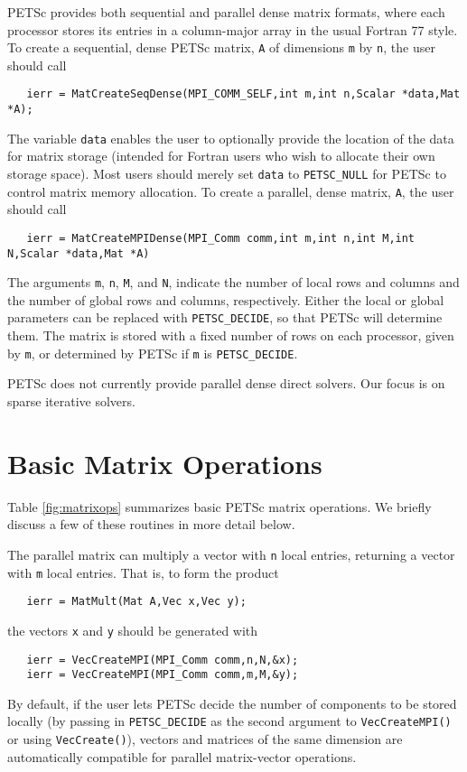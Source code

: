 PETSc provides both sequential and parallel dense matrix formats,
where each processor stores its entries in a column-major array in the
usual Fortran 77 style.  To create a sequential, dense PETSc matrix,
{\tt A} of dimensions {\tt m} by {\tt n}, the user should
call 
\begin{verbatim}
   ierr = MatCreateSeqDense(MPI_COMM_SELF,int m,int n,Scalar *data,Mat *A);
\end{verbatim}
The variable {\tt data} enables the user to optionally provide the
location of the data for matrix storage (intended for Fortran users who
wish to allocate their own storage space).  Most users should merely
set {\tt data} to {\tt PETSC\_NULL} for PETSc to control matrix memory allocation.
To create a parallel, dense matrix, {\tt A}, the user should call
\begin{verbatim}
   ierr = MatCreateMPIDense(MPI_Comm comm,int m,int n,int M,int N,Scalar *data,Mat *A)
\end{verbatim}
The arguments {\tt m}, {\tt n}, 
{\tt M}, and {\tt N}, indicate the number of local rows and columns and
the number of global rows and columns, respectively. Either the local or
global parameters can be replaced with {\tt PETSC\_DECIDE}, so that 
PETSc will determine  them.
The matrix is stored with a fixed number of rows on 
each processor, given by {\tt m}, or determined by PETSc if {\tt m} is
{\tt PETSC\_DECIDE}. 

PETSc does not currently provide parallel dense direct solvers. Our focus is on 
sparse iterative solvers.

\section{Basic Matrix Operations}
\label{sec:matoptions}

Table \ref{fig:matrixops} summarizes basic PETSc matrix operations.
We briefly discuss a few of these routines in more detail below.

The parallel matrix can multiply a vector with {\tt n} 
local entries, returning a vector with {\tt m} local entries. That is, 
to form the product 
\begin{verbatim}
   ierr = MatMult(Mat A,Vec x,Vec y);
\end{verbatim}
the vectors {\tt x} and {\tt y} should be generated with 
\begin{verbatim}
   ierr = VecCreateMPI(MPI_Comm comm,n,N,&x);
   ierr = VecCreateMPI(MPI_Comm comm,m,M,&y);
\end{verbatim}
By default, if the user lets PETSc decide the number of components to
be stored locally (by passing in {\tt PETSC\_DECIDE} as the second
argument to {\tt VecCreateMPI()} or using {\tt VecCreate()}), vectors
and matrices of the same dimension are automatically compatible for
parallel matrix-vector operations.

